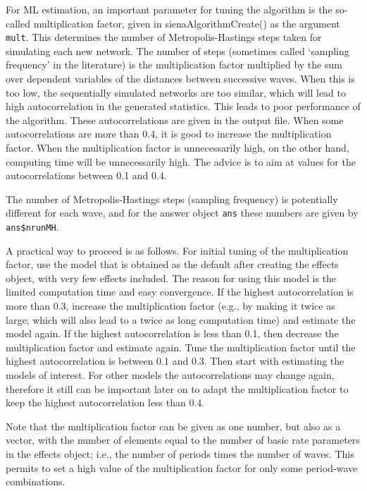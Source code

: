 \documentclass[a4paper,fleqn,11pt]{article}
\newcommand{\+}{\, + \,}
\newcommand{\sfn}[1]{\textsf{#1}}
\begin{document}
For ML estimation, an important parameter for tuning the
algorithm is the so-called \textsf{multiplication factor},
given in \sfn{sienaAlgorithmCreate()} as the argument \texttt{mult}.
This determines the number of Metropolis-Hastings steps taken
for simulating each new network.
The number of steps (sometimes called `sampling frequency' in the literature)
is the multiplication factor multiplied by the sum over dependent variables
of the distances between successive waves.
When this is too low, the
sequentially simulated networks are too similar, which will
lead to high autocorrelation in the generated statistics.
This leads to poor performance of the algorithm.
These autocorrelations are given in the output file. When some
autocorrelations are more than 0.4, it is good to increase the
\textsf{multiplication factor}.
When the \textsf{multiplication factor} is unnecessarily high,
on the other hand, computing time will be unnecessarily high.
The advice is to aim at values for the autocorrelations
between 0.1 and 0.4.

The number of Metropolis-Hastings steps (sampling frequency)
is potentially different for each wave,
and for the answer object \texttt{ans} these numbers are
given by \texttt{ans\$nrunMH}.

A practical way to proceed is as follows.
For initial tuning of the multiplication factor, use the model that
is obtained as the default after creating the effects object,
with very few effects included. The reason for using this model
is the limited computation time and easy convergence.
If the highest autocorrelation is more than 0.3, increase the
multiplication factor (e.g., by making it twice as large;
which will also lead to a twice as long computation time)
and estimate the model again.
If the highest autocorrelation is less than 0.1, then decrease
the multiplication factor and estimate again.
Tune the multiplication factor until the highest autocorrelation
is between 0.1 and 0.3.
Then start with estimating the models of interest.
For other models the autocorrelations may change again, therefore
it still can be important later on to adapt the multiplication factor
to keep the highest autocorrelation less than 0.4.

Note that the multiplication factor can be given as one number,
but also as a vector, with the number of elements equal to the number of
basic rate parameters in the effects object; i.e., the number
of periods times the number of waves. This permits to set a high
value of the multiplication factor for only some period-wave combinations.
\end{document}
